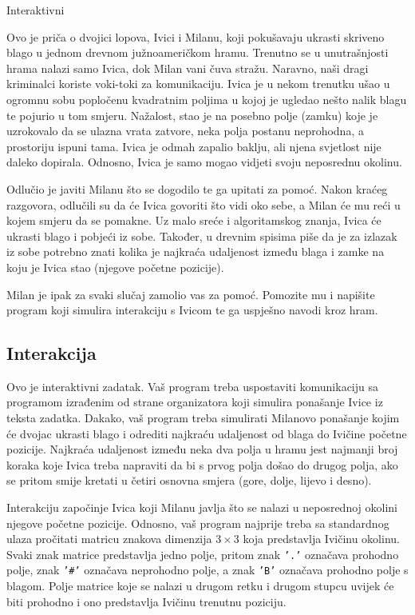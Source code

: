 \begin{statement}[
  problempoints=100,
  timelimit=5 sekundi,
  memorylimit=512 MiB,
]{Interaktivni}

Ovo je priča o dvojici lopova, Ivici i Milanu, koji pokušavaju ukrasti skriveno
blago u jednom drevnom južnoameričkom hramu. Trenutno se u unutrašnjosti
hrama nalazi samo Ivica, dok Milan vani čuva stražu. Naravno, naši dragi
kriminalci koriste voki-toki za komunikaciju. Ivica je u nekom trenutku ušao
u ogromnu sobu popločenu kvadratnim poljima u kojoj je ugledao nešto nalik
blagu te pojurio u tom smjeru. Nažalost, stao je na posebno polje (zamku)
koje je uzrokovalo da se ulazna vrata zatvore, neka polja postanu neprohodna,
a prostoriju ispuni tama. Ivica je odmah zapalio baklju, ali njena svjetlost
nije daleko dopirala.  Odnosno, Ivica je samo mogao vidjeti svoju neposrednu
okolinu.

Odlučio je javiti Milanu što se dogodilo te ga upitati za pomoć. Nakon kraćeg
razgovora, odlučili su da će Ivica govoriti što vidi oko sebe, a Milan će mu
reći u kojem smjeru da se pomakne. Uz malo sreće i algoritamskog znanja, Ivica
će ukrasti blago i pobjeći iz sobe. Također, u drevnim spisima piše da je za
izlazak iz sobe potrebno znati kolika je najkraća udaljenost između blaga i
zamke na koju je Ivica stao (njegove početne pozicije).

Milan je ipak za svaki slučaj zamolio vas za pomoć. Pomozite mu i napišite
program koji simulira interakciju s Ivicom te ga uspješno navodi kroz hram.

\subsection*{Interakcija}
Ovo je interaktivni zadatak. Vaš program treba uspostaviti komunikaciju sa
programom izrađenim od strane organizatora koji simulira ponašanje Ivice iz
teksta zadatka. Dakako, vaš program treba simulirati Milanovo ponašanje kojim
će dvojac ukrasti blago i odrediti najkraću udaljenost od blaga do Ivičine
početne pozicije. Najkraća udaljenost između neka dva polja u hramu jest
najmanji broj koraka koje Ivica treba napraviti da bi s prvog polja došao do
drugog polja, ako se pritom smije kretati u četiri osnovna smjera (gore,
dolje, lijevo i desno).

Interakciju započinje Ivica koji Milanu javlja što se nalazi u neposrednoj
okolini njegove početne pozicije. Odnosno, vaš program najprije treba sa
standardnog ulaza pročitati matricu znakova dimenzija $3\times3$ koja
predstavlja Ivičinu okolinu. Svaki znak matrice predstavlja jedno polje,
pritom znak \texttt{'.'} označava prohodno polje, znak \texttt{'\#'} označava
neprohodno polje, a znak \texttt{'B'} označava prohodno polje s blagom. Polje
matrice koje se nalazi u drugom retku i drugom stupcu uvijek će biti prohodno
i ono predstavlja Ivičinu trenutnu poziciju.


\end{statement}
